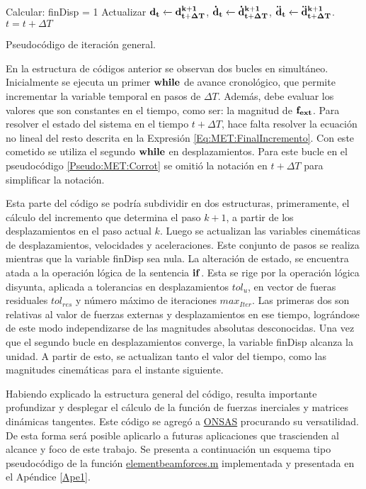 \begin{algorithm}
\begin{algorithmic}
		\STATE Calcular: 
		\STATE finDisp = 1
		\ENDIF
		\ENDWHILE
		\STATE Actualizar $\bf{d_{t}}\xleftarrow[]{}\bf{d^{k+1}_{t+\Delta T}}$, $\bf{\dot{d}_{t}}\xleftarrow[]{}\bf{\dot{d}^{k+1}_{t+\Delta T}}$, $\bf{\ddot{d}_t}\xleftarrow[]{}\bf{\ddot{d}^{k+1}_{t+\Delta T}}$.
		\STATE $t = t+\Delta T$	
		\ENDWHILE
	\end{algorithmic}
	\caption{Pseudocódigo de iteración general. }
	\label{Pseudo:MET:Corrot}
\end{algorithm}

En la estructura de códigos anterior se observan dos bucles en simultáneo. Inicialmente se ejecuta un primer $\bf{while}$ de avance cronológico, que permite incrementar la variable temporal en pasos de $\Delta T$. Además, debe evaluar los valores que son constantes en el tiempo, como ser: la magnitud de $\bf{f}_{ext}$. Para resolver el estado del sistema en el tiempo $t+\Delta T$, hace falta resolver la ecuación no lineal del resto descrita en la Expresión \eqref{Eq:MET:FinalIncremento}. Con este cometido se utiliza el segundo $\bf{while}$ en desplazamientos. Para este bucle en el pseudocódigo \ref{Pseudo:MET:Corrot} se omitió la notación en $t+\Delta T$ para simplificar la notación.

Esta parte del código se podría subdividir en dos estructuras, primeramente, el cálculo del incremento que determina el paso $k+1$, a partir de los desplazamientos en el paso actual $k$. Luego se actualizan las variables cinemáticas de desplazamientos, velocidades y aceleraciones. Este conjunto de pasos se realiza mientras que la variable finDisp sea nula. La alteración de estado, se encuentra atada a la operación lógica de la sentencia $\bf{if}$. Esta se rige por la operación lógica disyunta, aplicada a tolerancias en desplazamientos $tol_u$, en vector de fueras residuales $tol_{res}$ y número máximo de iteraciones $max_{Iter}$. Las primeras dos son relativas al valor de fuerzas externas y desplazamientos en ese tiempo, lográndose de este modo independizarse de las magnitudes absolutas desconocidas. Una vez que el segundo bucle en desplazamientos converge, la variable finDisp alcanza la unidad. A partir de esto, se actualizan tanto el valor del tiempo, como las magnitudes cinemáticas para el instante siguiente.

Habiendo explicado la estructura general del código, resulta importante profundizar y desplegar el cálculo de la función de fuerzas inerciales y matrices dinámicas tangentes. Este código se agregó a \href{https://github.com/ONSAS/ONSAS.m/}{ONSAS} procurando su versatilidad. De esta forma será posible aplicarlo a futuras aplicaciones que trascienden al alcance y foco de este trabajo. Se presenta a continuación un esquema tipo pseudocódigo de la función \href{https://github.com/ONSAS/ONSAS/blob/master/src/elementBeamForces.m}{elementbeamforces.m} implementada y presentada en el Apéndice \ref{Ape1}. 



